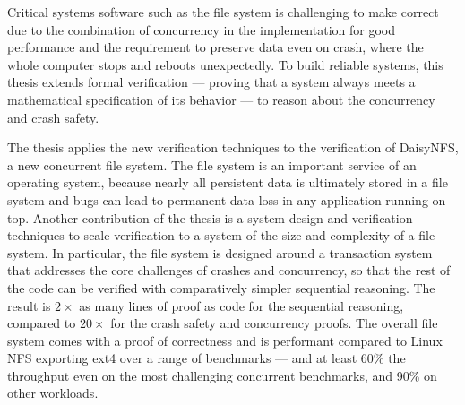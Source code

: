 Critical systems software such as the file system is challenging to make correct
due to the combination of concurrency in the implementation for good performance
and the requirement to preserve data even on crash, where the whole computer
stops and reboots unexpectedly. To build reliable systems, this thesis extends
formal verification --- proving that a system always meets a mathematical
specification of its behavior --- to reason about the concurrency and crash safety.

The thesis applies the new verification techniques to the verification of DaisyNFS, a new
concurrent file system. The file system is an important service of an operating
system, because nearly all persistent data is ultimately stored in a file system
and bugs can lead to permanent data loss in any application running on top.
Another contribution of the thesis is a system design and verification techniques
to scale verification to a system of the size and complexity of a file system.
In particular, the file system is designed around a transaction system that
addresses the core challenges of crashes and concurrency, so that the rest of
the code can be verified with comparatively simpler sequential reasoning.
The result is $2\times$ as many lines of proof as code for the sequential
reasoning, compared to $20\times$ for the crash safety and concurrency proofs.
The overall file system comes with a proof of correctness and
is performant compared to Linux NFS exporting ext4 over a
range of benchmarks --- and at least 60\% the throughput even on the most
challenging concurrent benchmarks, and 90\% on other workloads.

